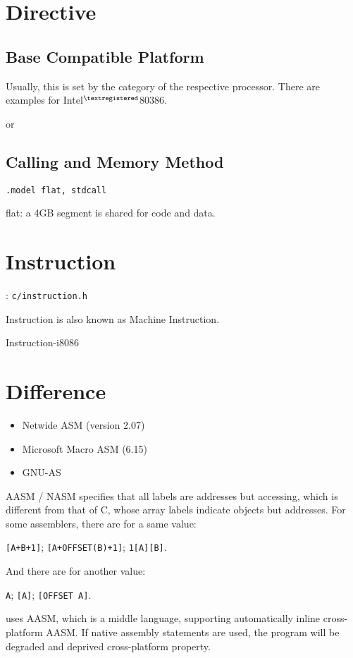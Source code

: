 
\section{Directive}

\subsection{Base Compatible Platform}

Usually, this is set by the category of the respective processor.
There are examples for Intel$^{\textregistered}$80386.


 or \T{[CPU 386]}




\subsection{Calling and Memory Method}


\verb`.model flat, stdcall` 

flat: a 4GB segment is shared for code and data.

\section{Instruction}
: \verb`c/instruction.h`


Instruction is also known as {Machine Instruction}.

{Instruction-i8086}

\section{Difference}

\begin{itemize}
\item Netwide ASM (version 2.07)
\item Microsoft Macro ASM (6.15)
\item GNU-AS
\end{itemize}

AASM / NASM specifies that all labels are addresses but accessing, which is different from that of C, whose array labels indicate objects but addresses.
For some assemblers, there are for a same value:

\verb|[A+B+1]|; \verb|[A+OFFSET(B)+1]|; \verb|1[A][B]|.

And there are for another value:

\verb|A|; \verb|[A]|; \verb|[OFFSET A]|.

 uses AASM, which is a middle language, supporting automatically inline cross-platform AASM. If native assembly statements are used, the program will be degraded and deprived cross-platform property.




